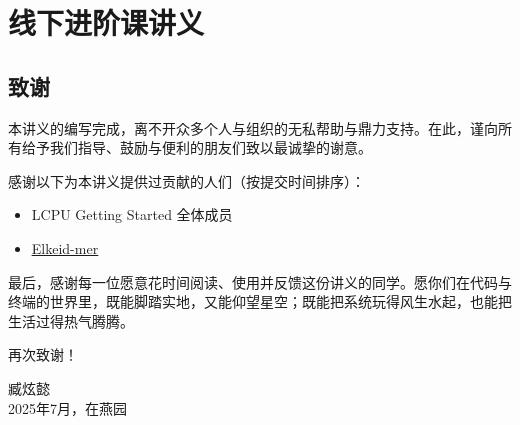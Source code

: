 \documentclass[12pt, openany]{book}
\let\oldhref\href
\renewcommand{\href}[2]{%
  \oldhref{#1}{%
    \color{blue}\underline{#2}%
    \raisebox{0.2ex}{\tiny$\nearrow$}%
  }%
}
\begin{document}






\part{线下进阶课讲义}









\backmatter 

\chapter{致谢}

本讲义的编写完成，离不开众多个人与组织的无私帮助与鼎力支持。在此，谨向所有给予我们指导、鼓励与便利的朋友们致以最诚挚的谢意。

感谢以下为本讲义提供过贡献的人们（按提交时间排序）：

\begin{itemize}
  \item LCPU Getting Started 全体成员
  \item \faGithub\href{https://github.com/Elkeid-mer}{Elkeid-mer}
\end{itemize}

最后，感谢每一位愿意花时间阅读、使用并反馈这份讲义的同学。愿你们在代码与终端的世界里，既能脚踏实地，又能仰望星空；既能把系统玩得风生水起，也能把生活过得热气腾腾。

再次致谢！

\vspace{2em}
\begin{flushright}
  臧炫懿 \\
  2025年7月，在燕园
\end{flushright}
\end{document}
